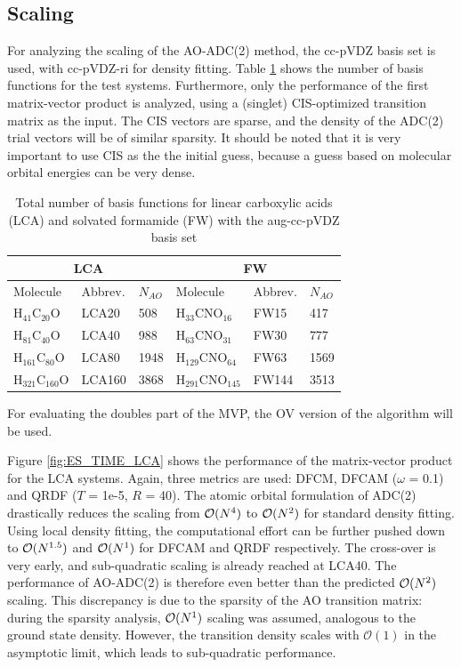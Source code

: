 \subsection{Scaling}

For analyzing the scaling of the AO-ADC(2) method, the cc-pVDZ basis set is used, with cc-pVDZ-ri for density fitting. Table \ref{tab:ES_NUMBAS} shows the number of basis functions for the test systems. Furthermore, only the performance of the first matrix-vector product is analyzed, using a (singlet) CIS-optimized transition matrix as the input. The CIS vectors are sparse, and the density of the ADC(2) trial vectors will be of similar sparsity. It should be noted that it is very important to use CIS as the the initial guess, because a guess based on molecular orbital energies can be very dense. 

\begin{table}[h]
\centering
\begin{tabular}{llllll}
\hline
\multicolumn{3}{c}{LCA} & \multicolumn{3}{c}{FW} \\ \hline
Molecule & Abbrev. & $N_{AO}$ & Molecule & Abbrev. & $N_{AO}$ \\ \hline
H$_{41}$C$_{20}$O & LCA20 & 508 & H$_{33}$CNO$_{16}$ & FW15 & 417 \\
H$_{81}$C$_{40}$O & LCA40 & 988 & H$_{63}$CNO$_{31}$ & FW30 & 777 \\
H$_{161}$C$_{80}$O & LCA80 & 1948 & H$_{129}$CNO$_{64}$ & FW63 & 1569 \\
H$_{321}$C$_{160}$O & LCA160 & 3868 & H$_{291}$CNO$_{145}$ & FW144 & 3513 \\
\hline
\end{tabular}
\caption{Total number of basis functions for linear carboxylic acids (LCA) and solvated formamide (FW) with the aug-cc-pVDZ basis set}
\label{tab:ES_NUMBAS}
\end{table}

For evaluating the doubles part of the MVP, the OV version of the algorithm will be used.

Figure \ref{fig:ES_TIME_LCA} shows the performance of the matrix-vector product for the LCA systems. Again, three metrics are used: DFCM, DFCAM ($\omega$ = 0.1) and QRDF ($T$ = 1e-5, $R$ = 40). The atomic orbital formulation of ADC(2) drastically reduces the scaling from $\mathcal{O}(N^{4})$ to $\mathcal{O}(N^{2})$ for standard density fitting. Using local density fitting, the computational effort can be further pushed down to $\mathcal{O}(N^{1.5})$ and $\mathcal{O}(N^{1})$ for DFCAM and QRDF respectively. The cross-over is very early, and sub-quadratic scaling is already reached at LCA40. The performance of AO-ADC(2) is therefore even better than the predicted $\mathcal{O}(N^{2})$ scaling. This discrepancy is due to the sparsity of the AO transition matrix: during the sparsity analysis, $\mathcal{O}(N^{1})$ scaling was assumed, analogous to the ground state density. However, the transition density scales with $\mathcal{O}(1)$ in the asymptotic limit, which leads to sub-quadratic performance.

